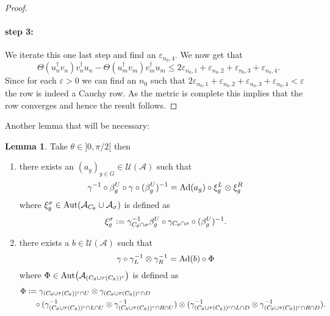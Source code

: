 \documentclass[12pt,a4paper,twoside]{article}
\newcommand{\defeq}{\vcentcolon=}
\let\originalleft\left
\let\originalright\right
\renewcommand{\left}{\mathopen{}\mathclose\bgroup\originalleft}
\renewcommand{\right}{\aftergroup\egroup\originalright}
\newcommand{\UU}{\mathcal U}
\renewcommand{\AA}{\mathcal A}
\newcommand{\Ad}[1]{\textrm{Ad}\left(#1\right)}
\newcommand{\Aut}[1]{\textrm{Aut}\left(#1\right)}
\theoremstyle{definition}
\newtheorem{lemma}[theorem]{Lemma}
\numberwithin{equation}{section}
\begin{document}
\begin{proof}
	\paragraph{step 3:}We iterate this one last step and find an $\varepsilon_{n_0,4}.$
	We now get that
	\begin{equation}
		\Theta(u_n^\dagger v_n)v_n^\dagger u_n-\Theta(u_m^\dagger v_m)v_m^\dagger u_m\leq 2\varepsilon_{n_0,1}+\varepsilon_{n_0,2}+\varepsilon_{n_0,3}+\varepsilon_{n_0,4}.
	\end{equation}
	Since for each $\varepsilon>0$ we can find an $n_0$ such that $2\varepsilon_{n_0,1}+\varepsilon_{n_0,2}+\varepsilon_{n_0,3}+\varepsilon_{n_0,4}<\varepsilon$ the row is indeed a Cauchy row. As the metric is complete this implies that the row converges and hence the result follows.
\end{proof}
Another lemma that will be necessary:
\begin{lemma}\label{lem:GroupActionInCone}
	Take $\theta\in]0,\pi/2[$ then
	\begin{enumerate}
		\item there exists an $(a_g)_{g\in G}\in\UU(\AA)$ such that
		\begin{equation}\label{eq:GroupActionInConeLemmaEquation1}
			\gamma^{-1}\circ\beta_g^U\circ\gamma\circ(\beta_g^U)^{-1}=\Ad{a_g}\circ\xi^L_g\otimes\xi^R_g
		\end{equation}
		where  $\xi_{g}^{\sigma}\in\Aut{\AA_{C_{\theta}}\cup\AA_{\sigma}}$ is defined as
		\begin{equation}
			\xi_{g}^{\sigma}\defeq \gamma_{C_\theta\cap\sigma}^{-1}\beta_g^U\circ\gamma_{C_\theta\cap\sigma}\circ(\beta_g^U)^{-1}.
		\end{equation}
		\item there exists a $b\in\UU(\AA)$ such that
		\begin{equation}\label{eq:GroupActionInConeLemmaEquation2}
			\gamma\circ\gamma_L^{-1}\otimes\gamma_R^{-1}=\Ad{b}\circ\Phi
		\end{equation}
		where $\Phi\in\Aut{\AA_{(C_\theta\cup \tau(C_\theta))^c}}$ is defined as
		\begin{align}
			\Phi&\defeq\gamma_{(C_\theta\cup\tau(C_\theta))^c\cap U}\otimes\gamma_{(C_\theta\cup\tau(C_\theta))^c\cap D}\\
			\nonumber
			&\quad\circ (\gamma_{(C_\theta\cup\tau(C_\theta))^c\cap L\cap U}^{-1}\otimes\gamma_{(C_\theta\cup\tau(C_\theta))^c\cap R\cap U}^{-1})\otimes (\gamma_{(C_\theta\cup\tau(C_\theta))^c\cap L\cap D}^{-1}\otimes\gamma_{(C_\theta\cup\tau(C_\theta))^c\cap R\cap D}^{-1}).
		\end{align}
	\end{enumerate}
\end{lemma}
\end{document}
